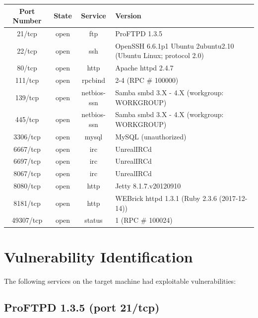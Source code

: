 \documentclass{article}
\begin{document}
\begin{adjustwidth}{-2cm}{}
\begin{tabular}{ |c|c|c|l| }
\hline
Port Number & State & Service & Version \\
\hline
21/tcp & open & ftp & ProFTPD 1.3.5 \\
\hline
22/tcp & open & ssh & OpenSSH 6.6.1p1 Ubuntu 2ubuntu2.10 (Ubuntu Linux; protocol 2.0) \\
\hline
80/tcp & open & http & Apache httpd 2.4.7 \\
\hline
111/tcp & open & rpcbind & 2-4 (RPC \# 100000) \\
\hline
139/tcp & open & netbios-ssn & Samba smbd 3.X - 4.X (workgroup: WORKGROUP) \\
\hline
445/tcp & open & netbios-ssn & Samba smbd 3.X - 4.X (workgroup: WORKGROUP) \\
\hline
3306/tcp & open & mysql & MySQL (unauthorized) \\
\hline
6667/tcp & open & irc & UnrealIRCd \\
\hline
6697/tcp & open & irc & UnrealIRCd \\
\hline
8067/tcp & open & irc & UnrealIRCd \\
\hline
8080/tcp & open & http & Jetty 8.1.7.v20120910 \\
\hline
8181/tcp & open & http & WEBrick httpd 1.3.1 (Ruby 2.3.6 (2017-12-14)) \\
\hline
49307/tcp & open & status & 1 (RPC \# 100024) \\
\hline
\end{tabular}
\end{adjustwidth}

\newpage

\section{Vulnerability Identification}
\label{sec:vulnerability_identification}
\paragraph{}
The following services on the target machine had exploitable vulnerabilities:

\subsection{ProFTPD 1.3.5 (port 21/tcp)}
\label{subsec:pro_ftpd}
\end{document}
